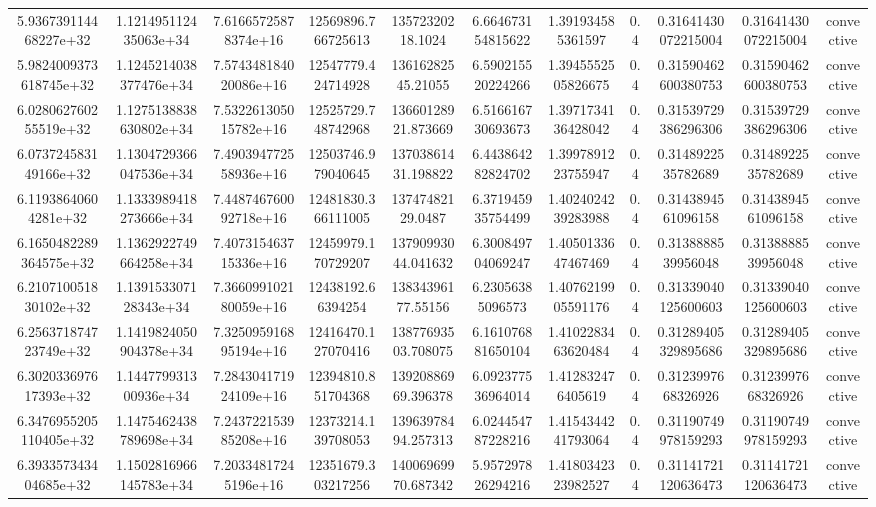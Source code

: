 \begin{table}
\begin{tabular}{ccccccccccc}
5.936739114468227e+32 & 1.121495112435063e+34 & 7.61665725878374e+16 & 12569896.766725613 & 13572320218.1024 & 6.664673154815622 & 1.391934585361597 & 0.4 & 0.31641430072215004 & 0.31641430072215004 & convective \\
5.9824009373618745e+32 & 1.1245214038377476e+34 & 7.574348184020086e+16 & 12547779.424714928 & 13616282545.21055 & 6.590215520224266 & 1.3945552505826675 & 0.4 & 0.31590462600380753 & 0.31590462600380753 & convective \\
6.028062760255519e+32 & 1.1275138838630802e+34 & 7.532261305015782e+16 & 12525729.748742968 & 13660128921.873669 & 6.516616730693673 & 1.3971734136428042 & 0.4 & 0.31539729386296306 & 0.31539729386296306 & convective \\
6.073724583149166e+32 & 1.1304729366047536e+34 & 7.490394772558936e+16 & 12503746.979040645 & 13703861431.198822 & 6.443864282824702 & 1.3997891223755947 & 0.4 & 0.3148922535782689 & 0.3148922535782689 & convective \\
6.11938640604281e+32 & 1.1333989418273666e+34 & 7.448746760092718e+16 & 12481830.366111005 & 13747482129.0487 & 6.371945935754499 & 1.4024024239283988 & 0.4 & 0.3143894561096158 & 0.3143894561096158 & convective \\
6.1650482289364575e+32 & 1.1362922749664258e+34 & 7.407315463715336e+16 & 12459979.170729207 & 13790993044.041632 & 6.300849704069247 & 1.4050133647467469 & 0.4 & 0.3138888539956048 & 0.3138888539956048 & convective \\
6.210710051830102e+32 & 1.139153307128343e+34 & 7.366099102180059e+16 & 12438192.66394254 & 13834396177.55156 & 6.23056385096573 & 1.4076219905591176 & 0.4 & 0.31339040125600603 & 0.31339040125600603 & convective \\
6.256371874723749e+32 & 1.1419824050904378e+34 & 7.325095916895194e+16 & 12416470.127070416 & 13877693503.708075 & 6.161076881650104 & 1.4102283463620484 & 0.4 & 0.31289405329895686 & 0.31289405329895686 & convective \\
6.302033697617393e+32 & 1.144779931300936e+34 & 7.284304171924109e+16 & 12394810.851704368 & 13920886969.396378 & 6.092377536964014 & 1.412832476405619 & 0.4 & 0.3123997668326926 & 0.3123997668326926 & convective \\
6.3476955205110405e+32 & 1.1475462438789698e+34 & 7.243722153985208e+16 & 12373214.139708053 & 13963978494.257313 & 6.024454787228216 & 1.4154344241793064 & 0.4 & 0.31190749978159293 & 0.31190749978159293 & convective \\
6.393357343404685e+32 & 1.1502816966145783e+34 & 7.20334817245196e+16 & 12351679.303217256 & 14006969970.687342 & 5.957297826294216 & 1.4180342323982527 & 0.4 & 0.31141721120636473 & 0.31141721120636473 & convective \\

\end{tabular}
\end{table}
